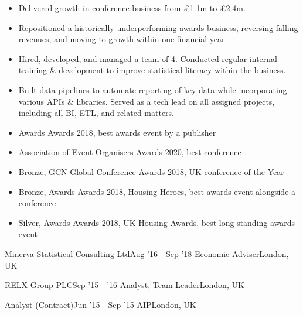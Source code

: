 \documentclass[letterpaper,11pt]{article}
\begin{document}
\begin{itemize}
\item Delivered growth in conference business from \pounds 1.1m to \pounds 2.4m.
\item Repositioned a historically underperforming awards business, reversing falling revenues, and moving to growth within one financial year.
\item Hired, developed, and managed a team of 4. Conducted regular internal training \& development to improve statistical literacy within the business. 
\item Built data pipelines to automate reporting of key data while incorporating various APIs \& libraries. Served as a tech lead on all assigned projects, including all BI, ETL, and related matters. 
\end{itemize}
\begin{itemize}
\item Awards Awards 2018, best awards event by a publisher
\item Association of Event Organisers Awards 2020, best conference
\item Bronze, GCN Global Conference Awards 2018, UK conference of the Year
\item Bronze, Awards Awards 2018, Housing Heroes, best awards event alongside a conference
\item Silver, Awards Awards 2018, UK Housing Awards, best long standing awards event
\end{itemize}
\resumeItemListEnd

\resumeSubheading
{Minerva Statistical Consulting Ltd}{Aug '16 - Sep '18}
{Economic Adviser}{London, UK}
\resumeItemListStart
{}
\resumeItemListEnd

\resumeSubheading
{RELX Group PLC}{Sep '15 - '16}
{Analyst, Team Leader}{London, UK}
\resumeItemListStart
{}
\resumeItemListEnd

\resumeSubheading
{Analyst (Contract)}{Jun '15 - Sep '15}
{AIP}{London, UK}
\resumeItemListStart
{}
\resumeItemListEnd
\end{document}
